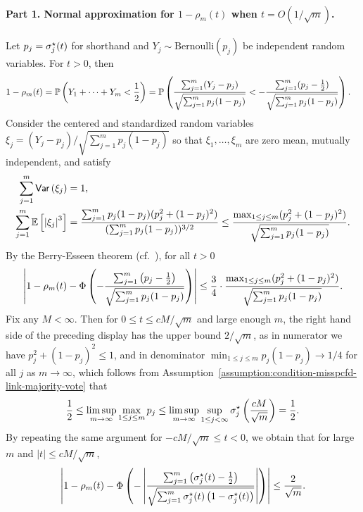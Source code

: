 \paragraph{Part 1. Normal approximation for $1- \rho_m(t)$ when $t = O(1/\sqrt{m})$.} Let $p_j = \sigma_j^\star(t)$ for shorthand and $Y_j \sim \mathrm{Bernoulli}(p_j)$ be independent random variables. For $t > 0$, then
\begin{align*}
  1 - \rho_m(t) & = \mathbb{P} \left({Y_1 + \cdots + Y_m < \frac{1}{2}}\right) = \mathbb{P}
  \left({\frac{\sum_{j=1}^m (Y_j - p_j)}{\sqrt{\sum_{j=1}^m p_j
        (1-p_j)}} < - \frac{\sum_{j=1}^m (p_j - \frac{1}{2})}{
      \sqrt{\sum_{j=1}^m p_j (1-p_j)}}}\right) .
\end{align*}
Consider the centered and standardized random variables $\xi_j = (Y_j - p_j)/\sqrt{\sum_{j=1}^m p_j (1-p_j)} $ so that $\xi_1, \dots, \xi_m$ are zero mean, mutually independent, and satisfy
\begin{align*}
  \sum_{j=1}^m \mathsf{Var} \left({\xi_j}\right) & = 1  , \\
  \sum_{j=1}^m \mathbb{E} \left[{\left|\xi_j\right|^3}\right] & =
  \frac{\sum_{j=1}^m p_j (1-p_j)(p_j^2 + (1-p_j)^2)}{({\sum_{j=1}^m p_j (1-p_j)})^{3/2}}
  \leq \frac{\max_{1 \leq j \leq m} (p_j^2 + (1-p_j)^2)}{\sqrt{\sum_{j=1}^m p_j(1-p_j)}}  .
\end{align*} 
By the Berry-Esseen theorem (cf.~\citet{ChenGoSh10, Shevtsova14}), for all
$t > 0$
\begin{align*}
	\left|1 - \rho_m(t) - \Phi \left(-\frac{ \sum_{j=1}^m \left( p_j - \frac{1}{2}\right)}{\sqrt{\sum_{j=1}^m p_j (1-p_j)}}\right)\right| \leq \frac{3}{4} \cdot \frac{\max_{1 \leq j \leq m} (p_j^2 + (1-p_j)^2)}{\sqrt{\sum_{j=1}^m p_j (1-p_j)}}  .
\end{align*}
%
Fix any $M <\infty$. Then for $0 \leq t \leq cM /\sqrt m$ and large enough
$m$, the right hand side of the preceding display has the upper bound
$2/\sqrt{m}$, as in numerator we have $p_j^2 + (1-p_j)^2 \leq 1$, and in
denominator $\min_{1 \leq j \leq m}p_j(1-p_j) \to 1/4$ for all $j$ as $m \to
\infty$, which follows from
Assumption~\ref{assumption:condition-misspcfd-link-majority-vote}
that
\begin{equation*}
  \frac{1}{2} \leq \limsup_{m \to \infty} \max_{1 \leq j \leq m} p_j \leq \limsup_{m \to \infty} \sup_{1 \leq j < \infty} {\sigma_j^\star} \left({\frac{cM}{\sqrt m} }\right) =
  \frac{1}{2}.
\end{equation*}
By repeating the same argument for $-cM /\sqrt m \leq t < 0$, we obtain that for large $m$ and $|t| \leq cM / \sqrt m$,
\begin{align}
  \left|1 - \rho_m(t) - \Phi \left(-\left|\frac{ \sum_{j=1}^m \left( \sigma_j^\star(t) - \frac{1}{2}\right)}{\sqrt{\sum_{j=1}^m \sigma_j^\star(t) \left({1 - \sigma_j^\star(t)}\right)}}\right|\right)\right| \leq \frac{2}{\sqrt m}   . \label{eq:BE-approximation}
\end{align}


